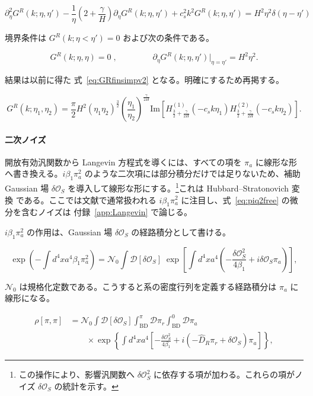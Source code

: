 \documentclass[a4paper,11pt]{ltjsarticle}
\numberwithin{equation}{section}
\def\pia{\pi_{a}}
\def\pir{\pi_{r}}
\newcommand{\Os}{\delta \mathcal{O}_{S}}
\newcommand{\Eq}[1]{Eq.~(\ref{#1})}
\newcommand{\App}[1]{Appendix~\ref{#1}}
\renewcommand{\Eq}[1]{式~\eqref{#1}}
\renewcommand{\App}[1]{付録~\ref{#1}}
\begin{document}
\begin{equation}
    \partial_{\eta}^{2}G^R(k;\eta,\eta')-\frac{1}{\eta}\left(2+\frac{\gamma}{H}\right)\partial_{\eta}G^R(k;\eta,\eta')+c_{s}^{2}k^{2}G^R(k;\eta,\eta')=H^{2}\eta^{2}\delta(\eta-\eta')
\end{equation}

境界条件は $G^R(k;\eta<\eta')=0$ および次の条件である。

\begin{equation}
    G^R(k;\eta,\eta)=0\;, \qquad \;\qquad \partial_{\eta}G^R(k;\eta,\eta')\bigg|_{\eta=\eta'}=H^{2}\eta^{2}.
\end{equation}

結果は以前に得た \Eq{eq:GRfinsimpv2} となる。明確にするため再掲する。

\begin{equation}
    G^R(k;\eta_{1},\eta_{2})=\frac{\pi}{2} H^{2} \left(\eta_{1}\eta_{2}\right)^{\frac{3}{2}}\left(\frac{\eta_{1}}{\eta_{2}}\right)^{\frac{\gamma}{2H}}\text{Im}\left[H_{\frac{3}{2}+\frac{\gamma}{2H}}^{(1)}(-c_{s}k\eta_{1})H_{\frac{3}{2}+\frac{\gamma}{2H}}^{(2)}(-c_{s}k\eta_{2})\right].
\end{equation}

\paragraph{二次ノイズ} 開放有効汎関数から Langevin 方程式を導くには、すべての項を $\pia$ に線形な形へ書き換える。$i\beta_1\pia^2$ のような二次項には部分積分だけでは足りないため、補助 Gaussian 場 $\Os$ を導入して線形な形にする。\footnote{この操作により、影響汎関数へ $\Os^2$ に依存する項が加わる。これらの項がノイズ $\Os$ の統計を示す。}これは Hubbard--Stratonovich 変換 \cite{Stratonovich1957,Hubbard1959} である。ここでは文献で通常扱われる $i\beta_1\pia^2$ に注目し、\Eq{eq:piq2free} の微分を含むノイズは \App{app:Langevin} で論じる。

$i\beta_1\pia^2$ の作用は、Gaussian 場 $\Os$ の経路積分として書ける。

\begin{equation}\label{eq:HStrick}
    \exp\left(-\int d^{4}x a^{4}\beta_{1}\pia^{2}\right)=\mathcal{N}_{0}\int\mathcal{D}[\Os]\;\exp\left[\int d^{4}x a^{4}\left(-\frac{\Os^{2}}{4\beta_{1}}+i\Os\pia\right)\right],
\end{equation}

$\mathcal N_0$ は規格化定数である。こうすると系の密度行列を定義する経路積分は $\pia$ に線形になる。

\begin{align}
    \rho[\pi,\pi]&=                \mathcal{N}_{0}\int\mathcal{D}[\Os]\int_{\text{BD}}^{\pi}\mathcal{D}\pir\int_{\text{BD}}^{0}\mathcal{D}\pia  \\
    & \qquad \times \exp\left\{\int d^{4}x a^{4}\left[-\frac{\Os^{2}}{4\beta_{1}}+i\left(-\widehat{D}_{R}\pir+\Os\right)\pia\right]\right\},\nonumber
\end{align}
\end{document}
